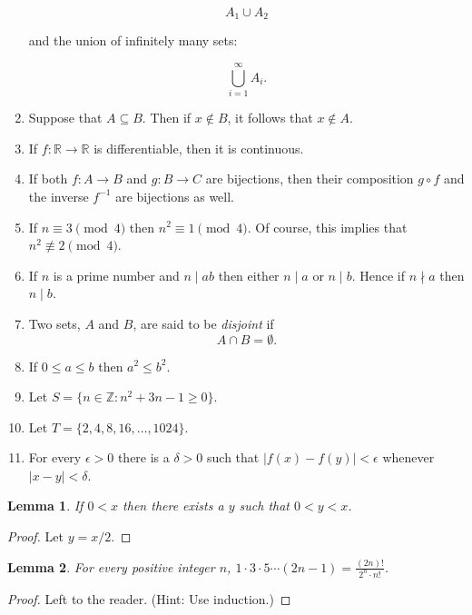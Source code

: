 \documentclass[12pt]{article}
\newcommand{\Z}{\mathbb Z}
\newcommand{\R}{\mathbb R}
\newtheorem{lemma}{Lemma}
\begin{document}
\begin{enumerate}
    $$A_1\cup A_2$$
    
    and the union of infinitely many sets:
    
    $$\bigcup_{i=1}^{\infty} A_i.$$   
    
\item Suppose that $A\subseteq B$. Then if $x\notin B$, it follows that $x\notin A$.    
    
\item  If $f:\R\longrightarrow \R$ is differentiable, then it is continuous.
    
\item  If both $f:A\longrightarrow B$ and $g:B\longrightarrow C$ are bijections, then their composition $g\circ f$ and the inverse $f^{-1}$ are bijections as well.
    
\item  If $n\equiv 3 \pmod 4$ then $n^2\equiv 1 \pmod 4$. Of course, this implies that $n^2\not\equiv 2 \pmod{4}$.
    
\item  If $n$ is a prime number and $n\mid ab$ then either $n\mid a$ or $n\mid b$. Hence if $n\nmid a$ then $n\mid b$.

\item  Two sets, $A$ and $B$, are said to be {\em disjoint} if $$A\cap B=\emptyset.$$
    
\item If $0\leq a\leq b$ then $a^2\leq b^2$.

\item  Let $S=\{ n\in\Z : n^2+3n-1\geq 0\}$.

\item  Let $T=\{ 2, 4, 8, 16, \ldots, 1024\}$.

\item  For every $\epsilon>0$ there is a $\delta>0$ such that $|f(x)-f(y)|<\epsilon$ whenever $|x-y|<\delta$.
    

\end{enumerate}

\begin{lemma} If $0<x$ then there exists a $y$ such that $0<y<x$.
\end{lemma}
\begin{proof}
Let $y=x/2$.
\end{proof}

\begin{lemma} For every positive integer $n$, $1\cdot 3\cdot 5\cdots (2n-1)=\displaystyle\frac{(2n)!}{2^n\cdot n!}$.
\end{lemma}
\begin{proof}
Left to the reader. (Hint: Use induction.)
\end{proof}



 
\end{document}
